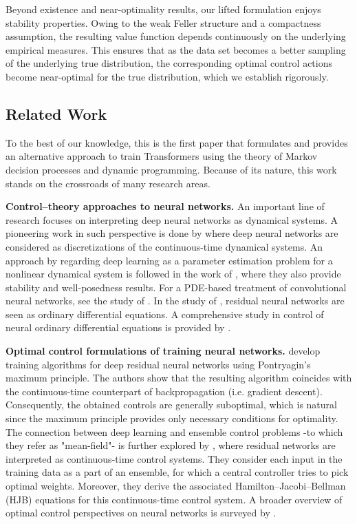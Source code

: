 \documentclass[11pt]{article}
\begin{document}
Beyond existence and near-optimality results, our lifted formulation enjoys stability properties. Owing to the weak Feller structure and a compactness assumption, the resulting value function depends continuously on the underlying empirical measures. This ensures that as the data set becomes a better sampling of the underlying true distribution, the corresponding optimal control actions become near-optimal for the true distribution, which we establish rigorously.

\subsection{Related Work} To the best of our knowledge, this is the first paper that formulates and provides an alternative approach to train Transformers using the theory of Markov decision processes and dynamic programming. Because of its nature, this work stands on the crossroads of many research areas.
\medskip

\noindent\textbf{Control--theory approaches to neural networks.}  An important line of research focuses on interpreting deep neural networks as dynamical systems. A pioneering work in such perspective is done by \cite{weinan2017proposal} where deep neural networks are considered as discretizations of the continuous-time dynamical systems. An approach by regarding deep learning as  a parameter estimation problem for a nonlinear dynamical system is followed in the work of \cite{haber2017stable}, where they also provide stability and well-posedness results. For a PDE-based treatment of convolutional neural networks, see the study of \cite{ruthotto2020deep}. In the study of \cite{chen2018neural}, residual neural networks are seen as ordinary differential equations. A comprehensive study in control of neural ordinary differential equations is provided by \cite{ruiz2023neural}.
\medskip

\noindent\textbf{Optimal control formulations of training neural networks.} \cite{li2018maximum} develop training algorithms for deep residual neural networks using Pontryagin’s maximum principle. The authors show that the resulting algorithm coincides with the continuous-time counterpart of backpropagation (i.e. gradient descent). Consequently, the obtained controls are generally suboptimal, which is natural since the maximum principle provides only necessary conditions for optimality. The connection between deep learning and ensemble control problems -to which they refer as "mean-field"- is further explored by \cite{E2019}, where residual networks are interpreted as continuous-time control systems. They consider each input in the training data as a part of an ensemble, for which a central controller tries to pick optimal weights. Moreover, they derive the associated Hamilton–Jacobi–Bellman (HJB) equations for this continuous-time control system. A broader overview of optimal control perspectives on neural networks is surveyed by \cite{benning2021}.
\medskip
\end{document}
